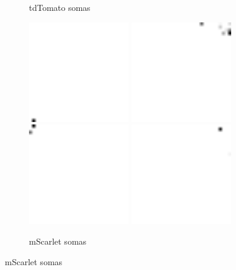 \begin{figure}
\begin{subfigure}[b]{0.3\textwidth}
		\caption{tdTomato somas}
		\label{fig:tdtomato_somas}
	\end{subfigure}
	\quad%
	\begin{subfigure}[b]{0.3\textwidth}
		\includegraphics[width=0.48\textwidth]{mScarlet_1}
		\includegraphics[width=0.48\textwidth]{mScarlet_2} \\[2pt]
		\includegraphics[width=0.48\textwidth]{mScarlet_3}
		\includegraphics[width=0.48\textwidth]{mScarlet_4}
		\caption{mScarlet somas}
		\label{fig:mscarlet_somas}
	\end{subfigure}


\end{figure}
